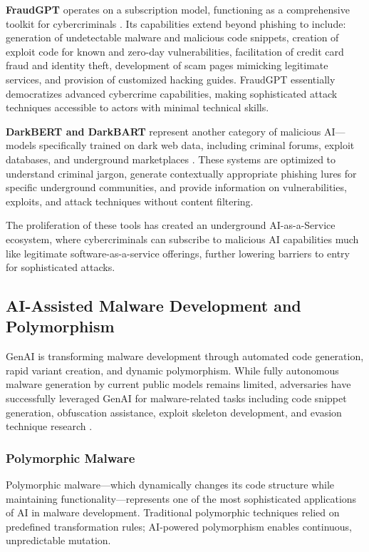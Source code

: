 \textbf{FraudGPT} operates on a subscription model, functioning as a comprehensive toolkit for cybercriminals \cite{scadafence2024}. Its capabilities extend beyond phishing to include: generation of undetectable malware and malicious code snippets, creation of exploit code for known and zero-day vulnerabilities, facilitation of credit card fraud and identity theft, development of scam pages mimicking legitimate services, and provision of customized hacking guides. FraudGPT essentially democratizes advanced cybercrime capabilities, making sophisticated attack techniques accessible to actors with minimal technical skills.

\textbf{DarkBERT and DarkBART} represent another category of malicious AI—models specifically trained on dark web data, including criminal forums, exploit databases, and underground marketplaces \cite{darkllms2023}. These systems are optimized to understand criminal jargon, generate contextually appropriate phishing lures for specific underground communities, and provide information on vulnerabilities, exploits, and attack techniques without content filtering.

The proliferation of these tools has created an underground AI-as-a-Service ecosystem, where cybercriminals can subscribe to malicious AI capabilities much like legitimate software-as-a-service offerings, further lowering barriers to entry for sophisticated attacks.

\subsection{AI-Assisted Malware Development and Polymorphism}

GenAI is transforming malware development through automated code generation, rapid variant creation, and dynamic polymorphism. While fully autonomous malware generation by current public models remains limited, adversaries have successfully leveraged GenAI for malware-related tasks including code snippet generation, obfuscation assistance, exploit skeleton development, and evasion technique research \cite{barracuda2024}.

\subsubsection{Polymorphic Malware}

Polymorphic malware—which dynamically changes its code structure while maintaining functionality—represents one of the most sophisticated applications of AI in malware development. Traditional polymorphic techniques relied on predefined transformation rules; AI-powered polymorphism enables continuous, unpredictable mutation.

